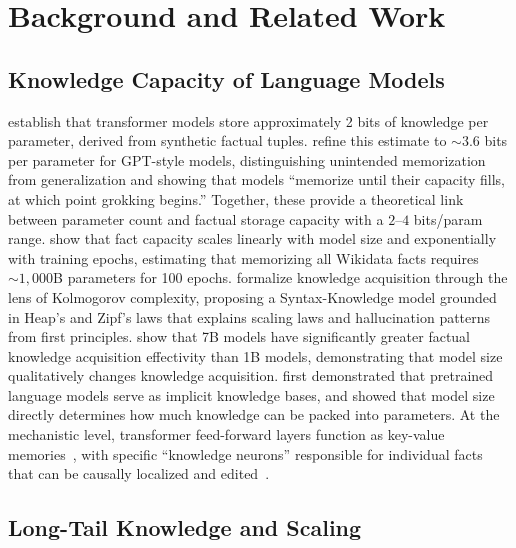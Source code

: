 \documentclass[11pt]{article}
\begin{document}
\section{Background and Related Work}
\label{sec:related}

\subsection{Knowledge Capacity of Language Models}

\citet{allenzhu2025} establish that transformer models store approximately 2 bits of knowledge per parameter, derived from synthetic factual tuples. \citet{morris2025memorize} refine this estimate to ${\sim}3.6$ bits per parameter for GPT-style models, distinguishing unintended memorization from generalization and showing that models ``memorize until their capacity fills, at which point grokking begins.'' Together, these provide a theoretical link between parameter count and factual storage capacity with a $2$--$4$ bits/param range. \citet{lu2024factmemorization} show that fact capacity scales linearly with model size and exponentially with training epochs, estimating that memorizing all Wikidata facts requires ${\sim}1{,}000$B parameters for 100 epochs. \citet{pan2025compression} formalize knowledge acquisition through the lens of Kolmogorov complexity, proposing a Syntax-Knowledge model grounded in Heap's and Zipf's laws that explains scaling laws and hallucination patterns from first principles. \citet{chang2024} show that 7B models have significantly greater factual knowledge acquisition effectivity than 1B models, demonstrating that model size qualitatively changes knowledge acquisition. \citet{petroni2019language} first demonstrated that pretrained language models serve as implicit knowledge bases, and \citet{roberts2020much} showed that model size directly determines how much knowledge can be packed into parameters. At the mechanistic level, transformer feed-forward layers function as key-value memories~\citep{geva2021transformer}, with specific ``knowledge neurons'' responsible for individual facts~\citep{dai2022knowledge} that can be causally localized and edited~\citep{meng2022locating}.

\subsection{Long-Tail Knowledge and Scaling}
\end{document}

